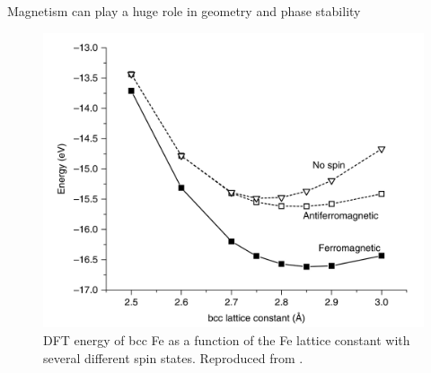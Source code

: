 \documentclass[aspectratio=169]{beamer}
\begin{document}
\begin{frame}{Magnetism can play a huge role in geometry and phase stability}
\begin{figure}
    \centering
    \includegraphics[width=0.5\linewidth]{lectures/figures/8_magnetism_Fe.png}
    \caption{DFT energy of bcc Fe as a function of the Fe lattice constant with several different spin states. Reproduced from \cite{shollDensityFunctionalTheory2023}.}
\end{figure} 
\end{frame} 
\end{document}
